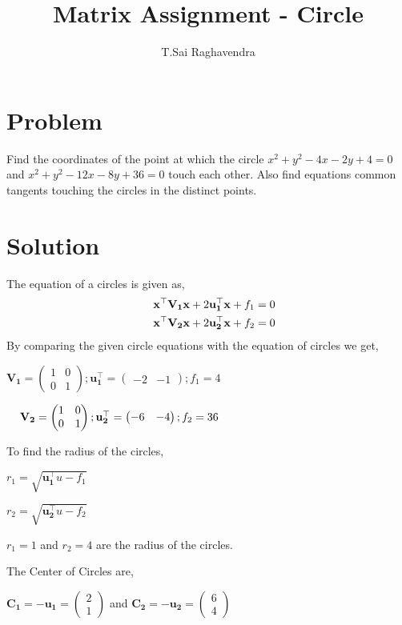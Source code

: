 \documentclass[journal,12pt,twocolumn]{IEEEtran}
\title{\mytitle}
\title{
Matrix Assignment - Circle
}
\author{T.Sai Raghavendra}
\newcommand{\myvec}[1]{\ensuremath{\begin{pmatrix}#1\end{pmatrix}}}
\let\vec\mathbf
\begin{document}
\maketitle
\tableofcontents
\bigskip


\section{\textbf{Problem}}
Find the coordinates of the point at which the circle $x^2+y^2-4x-2y+4=0$ and $x^2+y^2-12x-8y+36        =0$ touch each other. Also find equations common tangents touching the circles in the distinct points.


\section{\textbf{Solution}}
The equation of a circles is given as,   
\begin{align}
{\vec{x^{\top}V_1 x} + 2\vec{u_1^{\top}x}} + f_1=0 \\
{\hspace{0.4cm}\vec{x^{\top}V_2 x} + 2\vec{u_2^{\top}x}} + f_2=0
\end{align}
By comparing the given circle equations with the equation of circles we get,

\begin{center}
$\vec{V_1}=\myvec{1&0\\ 0&1} ; \vec{u_1^{\top}}=\myvec{-2&-1} ; f_1=4$

$\hspace*{0.4cm}\vec{V_2}=\myvec{1&0\\ 0&1} ; \vec{u_2^{\top}}=\myvec{-6&-4} ; f_2=36$
\end{center}

To find the radius of the circles,

\begin{center}
$r_1 = {\sqrt{\vec{u_1^\top}u - f_1}}$
\end{center}

\begin{center}
$r_2 = {\sqrt{\vec{u_2^\top}u - f_2}}$
\end{center}

$r_1=1$ and $r_2=4$ are the radius of the circles.

The Center of Circles are,

$\vec{C_1=-u_1} = \myvec{2\\1}$ and $\vec{C_2=-u_2} = \myvec{6\\4}$\\
\end{document}
